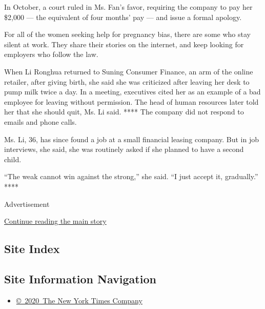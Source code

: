 In October, a court ruled in Ms. Fan's favor, requiring the company to
pay her \$2,000 --- the equivalent of four months' pay --- and issue a
formal apology.

For all of the women seeking help for pregnancy bias, there are some who
stay silent at work. They share their stories on the internet, and keep
looking for employers who follow the law.

When Li Ronghua returned to Suning Consumer Finance, an arm of the
online retailer, after giving birth, she said she was criticized after
leaving her desk to pump milk twice a day. In a meeting, executives
cited her as an example of a bad employee for leaving without
permission. The head of human resources later told her that she should
quit, Ms. Li said. **** The company did not respond to emails and phone
calls.

Ms. Li, 36, has since found a job at a small financial leasing company.
But in job interviews, she said, she was routinely asked if she planned
to have a second child.

``The weak cannot win against the strong,'' she said. ``I just accept
it, gradually.'' ****

Advertisement

\protect\hyperlink{after-bottom}{Continue reading the main story}

\hypertarget{site-index}{%
\subsection{Site Index}\label{site-index}}

\hypertarget{site-information-navigation}{%
\subsection{Site Information
Navigation}\label{site-information-navigation}}

\begin{itemize}
\tightlist
\item
  \href{https://help.nytimes3xbfgragh.onion/hc/en-us/articles/115014792127-Copyright-notice}{©~2020~The
  New York Times Company}
\end{itemize}

